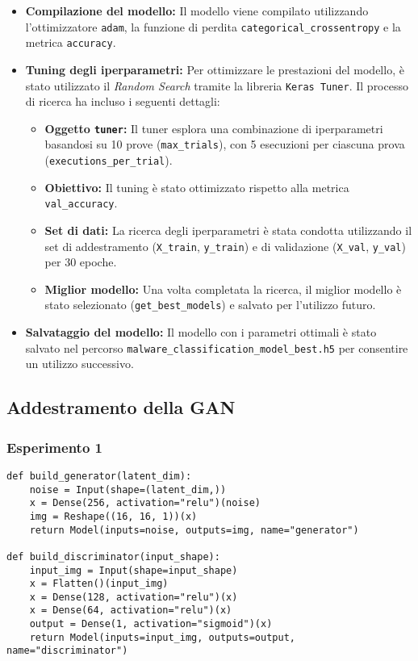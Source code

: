 \begin{itemize}
    \item \textbf{Compilazione del modello:} 
    Il modello viene compilato utilizzando l'ottimizzatore \texttt{adam}, la funzione di perdita \texttt{categorical\_crossentropy} e la metrica \texttt{accuracy}.

    \item \textbf{Tuning degli iperparametri:} 
    Per ottimizzare le prestazioni del modello, è stato utilizzato il \textit{Random Search} tramite la libreria \texttt{Keras Tuner}. Il processo di ricerca ha incluso i seguenti dettagli:
    \begin{itemize}
        \item \textbf{Oggetto \texttt{tuner}:} Il tuner esplora una combinazione di iperparametri basandosi su 10 prove (\texttt{max\_trials}), con 5 esecuzioni per ciascuna prova (\texttt{executions\_per\_trial}).
        \item \textbf{Obiettivo:} Il tuning è stato ottimizzato rispetto alla metrica \texttt{val\_accuracy}.
        \item \textbf{Set di dati:} La ricerca degli iperparametri è stata condotta utilizzando il set di addestramento (\texttt{X\_train}, \texttt{y\_train}) e di validazione (\texttt{X\_val}, \texttt{y\_val}) per 30 epoche.
        \item \textbf{Miglior modello:} Una volta completata la ricerca, il miglior modello è stato selezionato (\texttt{get\_best\_models}) e salvato per l'utilizzo futuro.
    \end{itemize}

    \item \textbf{Salvataggio del modello:} 
    Il modello con i parametri ottimali è stato salvato nel percorso \texttt{malware\_classification\_model\_best.h5} per consentire un utilizzo successivo.
\end{itemize}


\subsection{Addestramento della GAN}

\subsubsection{Esperimento 1}
\begin{lstlisting}[caption={Primo modello di GAN generato},captionpos=b]
def build_generator(latent_dim):
    noise = Input(shape=(latent_dim,))
    x = Dense(256, activation="relu")(noise)
    img = Reshape((16, 16, 1))(x)
    return Model(inputs=noise, outputs=img, name="generator")

def build_discriminator(input_shape):
    input_img = Input(shape=input_shape)
    x = Flatten()(input_img)
    x = Dense(128, activation="relu")(x)
    x = Dense(64, activation="relu")(x)
    output = Dense(1, activation="sigmoid")(x)
    return Model(inputs=input_img, outputs=output, name="discriminator")
\end{lstlisting}


